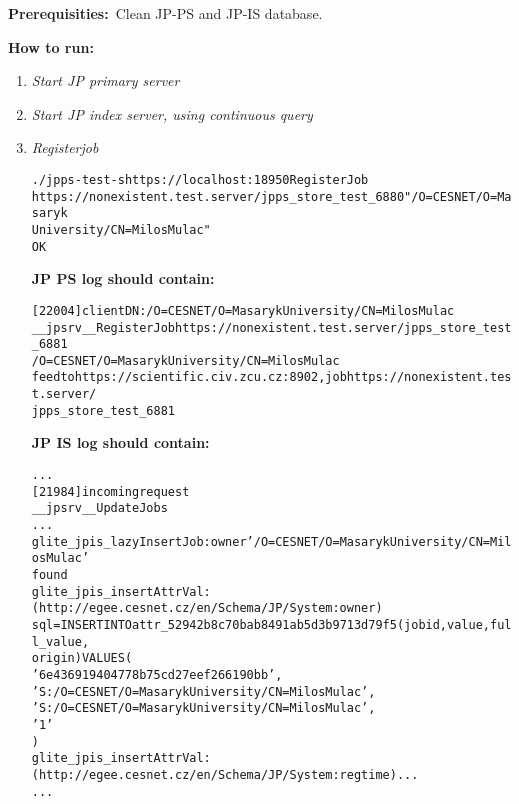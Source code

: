 \documentclass{egee}
\def\req{\noindent\textbf{Prerequisities:}}
\def\how{\noindent\textbf{How to run:}}
\def\jpps{\noindent\textbf{JP PS log should contain:}}
\def\jpis{\noindent\textbf{JP IS log should contain:}}
\begin{document}
\req\ Clean JP-PS and JP-IS database.

\how\
\begin{enumerate}
 \item \emph{Start JP primary server}
 \item \emph{Start JP index server, using continuous query}
 \item \emph{Registerjob}
  \begin{alltt}
	./jpps-test -s https://localhost:18950 RegisterJob 
	https://nonexistent.test.server/jpps_store_test_6880 "/O=CESNET/O=Masaryk 
	University/CN=Milos Mulac"
	OK
  \end{alltt}
  \jpps\
  \begin{alltt}
	[22004] client DN: /O=CESNET/O=Masaryk University/CN=Milos Mulac
	__jpsrv__RegisterJob https://nonexistent.test.server/jpps_store_test_6881 
	/O=CESNET/O=Masaryk University/CN=Milos Mulac
	feed to https://scientific.civ.zcu.cz:8902, job https://nonexistent.test.server/
	jpps_store_test_6881
  \end{alltt}
  \jpis\
  \begin{alltt}
	...
	[21984] incoming request
	__jpsrv__UpdateJobs
	...
	glite_jpis_lazyInsertJob: owner '/O=CESNET/O=Masaryk University/CN=Milos Mulac'
	found
	glite_jpis_insertAttrVal: (http://egee.cesnet.cz/en/Schema/JP/System:owner) 
	sql=INSERT INTO attr_52942b8c70bab8491ab5d3b9713d79f5 (jobid, value, full_value, 
	origin) VALUES (
        '6e436919404778b75cd27eef266190bb',
        'S:/O=CESNET/O=Masaryk University/CN=Milos Mulac',
        'S:/O=CESNET/O=Masaryk University/CN=Milos Mulac',
        '1'
)
	glite_jpis_insertAttrVal: (http://egee.cesnet.cz/en/Schema/JP/System:regtime) ...
	...
  \end{alltt}


\end{enumerate}
\end{document}
